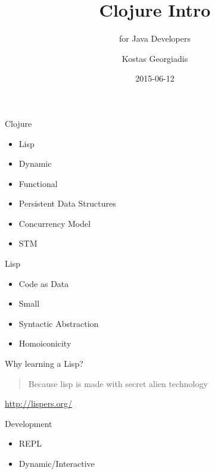 \documentclass[10pt, compress]{beamer}
\title{Clojure Intro}
\subtitle{for Java Developers}
\date{2015-06-12}
\author{Kostas Georgiadis}
\institute{@kongeor kongeor@gmail.com}
\begin{document}
\maketitle

\begin{frame}{Clojure}
  \begin{itemize}
    \item Lisp
    \item Dynamic
    \item Functional
    \item Persistent Data Structures
    \item Concurrency Model
    \item STM
  \end{itemize}
\end{frame}

\begin{frame}{Lisp}
  \begin{itemize}
    \item Code as Data
    \item Small
    \item Syntactic Abstraction
    \item Homoiconicity
  \end{itemize}
\end{frame}

\begin{frame}{Why learning a Lisp?}

  \begin{center}

    \begin{large}

      \begin{quote}
        Because lisp is made with secret alien technology
      \end{quote}

    \end{large}

    \url{http://lispers.org/}

  \end{center}

\end{frame}

\begin{frame}{Development}
  \begin{itemize}
    \item REPL
    \item Dynamic/Interactive
  \end{itemize}
\end{frame}
\end{document}
